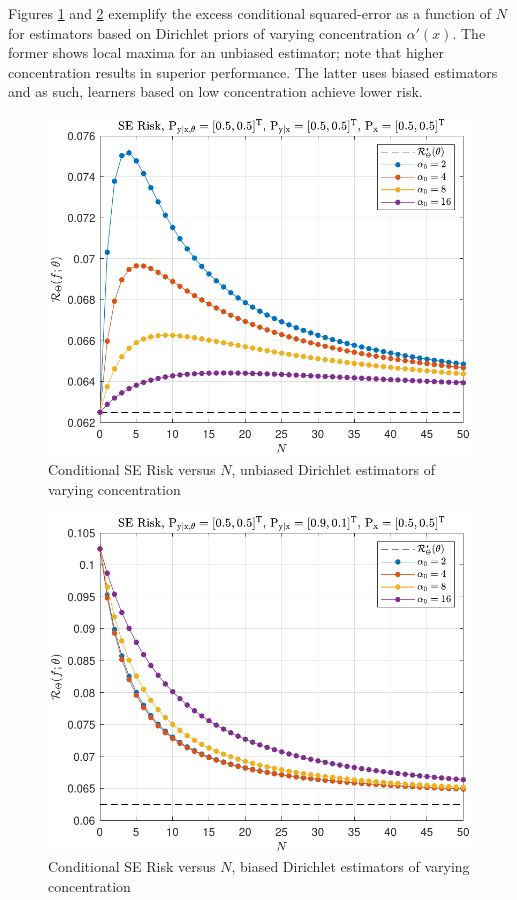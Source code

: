 \documentclass[12pt]{report}
\begin{document}
Figures \ref{fig:Risk_cond_SE_Dir_N_leg_a0_unbiased} and \ref{fig:Risk_cond_SE_Dir_N_leg_a0_biased} exemplify the excess conditional squared-error as a function of $N$ for estimators based on Dirichlet priors of varying concentration $\alpha'(x)$. The former shows local maxima for an unbiased estimator; note that higher concentration results in superior performance. The latter uses biased estimators and as such, learners based on low concentration achieve lower risk.
\begin{figure}
\centering
\includegraphics[width=0.7\linewidth]{Risk_cond_SE_Dir_N_leg_a0_unbiased.pdf}
\caption{Conditional SE Risk versus $N$, unbiased Dirichlet estimators of varying concentration}
\label{fig:Risk_cond_SE_Dir_N_leg_a0_unbiased}
\end{figure}
\begin{figure}
\centering
\includegraphics[width=0.7\linewidth]{Risk_cond_SE_Dir_N_leg_a0_biased.pdf}
\caption{Conditional SE Risk versus $N$, biased Dirichlet estimators of varying concentration}
\label{fig:Risk_cond_SE_Dir_N_leg_a0_biased}
\end{figure}
\end{document}
